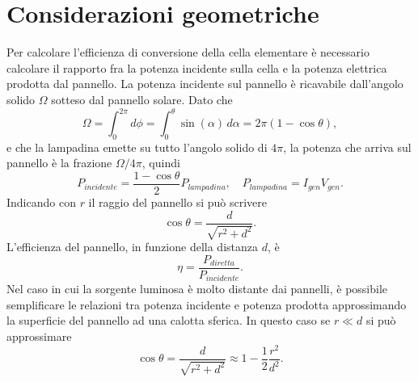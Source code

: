 \section{Considerazioni geometriche}
Per calcolare l'efficienza di conversione della cella elementare è necessario calcolare il rapporto fra la potenza incidente sulla cella e la potenza elettrica prodotta dal pannello. La potenza incidente sul pannello è ricavabile dall'angolo solido $\Omega$ sotteso dal pannello solare. Dato che
\begin{equation}
    \Omega=\int_{0}^{2\pi}d\phi=\int_{0}^{\theta}\sin{(\alpha)}\,d\alpha=2\pi(1-\cos{\theta}),
\end{equation}
e che la lampadina emette su tutto l'angolo solido di $4\pi$, la potenza che arriva sul pannello è la frazione $\Omega/4\pi$, quindi
\begin{equation}
    P_{incidente}=\frac{1-\cos{\theta}}{2}P_{lampadina},\quad P_{lampadina}=I_{gen}V_{gen}.
\end{equation}
Indicando con $r$ il raggio del pannello si può scrivere
\begin{equation}
    \cos{\theta}=\frac{d}{\sqrt{r^2+d^2}}.
\end{equation}
L'efficienza del pannello, in funzione della distanza $d$, è
\begin{equation}
    \eta=\frac{P_{diretta}}{P_{incidente}}.
\end{equation}
Nel caso in cui la sorgente luminosa è molto
distante dai pannelli, è possibile semplificare le relazioni tra potenza incidente e potenza prodotta approssimando la superficie del pannello ad una calotta sferica. In questo caso se $r\ll d$ si può approssimare
\begin{equation}
    \cos{\theta}=\frac{d}{\sqrt{r^2+d^2}}\approx 1-\frac{1}{2}\frac{r^2}{d^2}.
\end{equation}